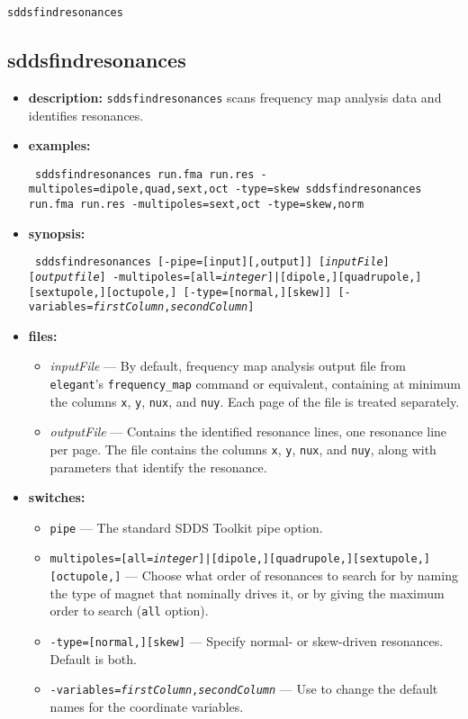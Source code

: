 \documentclass[11pt]{article}
\begin{document}
\newpage
\begin{center}{\Large\verb|sddsfindresonances|}\end{center}
\subsection{sddsfindresonances}

\begin{itemize}
\item {\bf description:} {\tt sddsfindresonances} scans frequency map analysis data and
identifies resonances.

\item {\bf examples:}
\begin{flushleft}{\tt
sddsfindresonances run.fma run.res -multipoles=dipole,quad,sext,oct -type=skew
sddsfindresonances run.fma run.res -multipoles=sext,oct -type=skew,norm
}\end{flushleft}

\item {\bf synopsis:}
\begin{flushleft}{\tt
sddsfindresonances [-pipe=[input][,output]] [{\em inputFile}] [{\em outputfile}]
 -multipoles=[all={\em integer}]|[dipole,][quadrupole,][sextupole,][octupole,]
 [-type=[normal,][skew]] [-variables={\em firstColumn},{\em secondColumn}]
}\end{flushleft}

\item {\bf files:}
\begin{itemize}
\item {\em inputFile} --- By default, frequency map analysis output file from {\tt elegant}'s {\tt frequency\_map} command
or equivalent, containing at minimum the columns {\tt x}, {\tt y}, {\tt nux}, and {\tt nuy}.  Each page of the file is
treated separately.
\item {\em outputFile} --- Contains the identified resonance lines, one resonance line per page.  The file contains
the columns {\tt x}, {\tt y}, {\tt nux}, and {\tt nuy}, along with parameters that identify the resonance.
\end{itemize}

\item {\bf switches:}
\begin{itemize}
\item {\tt pipe} --- The standard SDDS Toolkit pipe option.
\item {\tt multipoles=[all={\em integer}]|[dipole,][quadrupole,][sextupole,][octupole,]} --- Choose what order of resonances to 
  search for by naming the type of magnet that nominally drives it, or by giving the maximum order to search ({\tt all} option).
\item {\tt -type=[normal,][skew]} --- Specify normal- or skew-driven resonances.  Default is both.
\item {\tt -variables={\em firstColumn},{\em secondColumn}} --- Use to change the default names for the coordinate variables.
\end{itemize}


\end{itemize}
\end{document}
